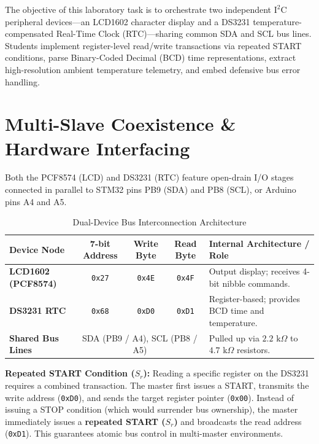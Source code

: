 \documentclass[11pt,a4paper]{article}
\begin{document}

\begin{objectivebox}
The objective of this laboratory task is to orchestrate two independent $\text{I}^2\text{C}$ peripheral devices—an LCD1602 character display and a DS3231 temperature-compensated Real-Time Clock (RTC)—sharing common SDA and SCL bus lines. Students implement register-level read/write transactions via repeated START conditions, parse Binary-Coded Decimal (BCD) time representations, extract high-resolution ambient temperature telemetry, and embed defensive bus error handling.
\end{objectivebox}

\section{Multi-Slave Coexistence \& Hardware Interfacing}
Both the PCF8574 (LCD) and DS3231 (RTC) feature open-drain I/O stages connected in parallel to STM32 pins PB9 (SDA) and PB8 (SCL), or Arduino pins A4 and A5.

\begin{table}[h!]
\centering
\small
\caption{Dual-Device Bus Interconnection Architecture}
\vspace{4pt}
\begin{tabularx}{\textwidth}{l c c c X}
\toprule
\textbf{Device Node} & \textbf{7-bit Address} & \textbf{Write Byte} & \textbf{Read Byte} & \textbf{Internal Architecture / Role} \\
\midrule
\textbf{LCD1602 (PCF8574)} & \texttt{0x27} & \texttt{0x4E} & \texttt{0x4F} & Output display; receives 4-bit nibble commands. \\
\textbf{DS3231 RTC} & \texttt{0x68} & \texttt{0xD0} & \texttt{0xD1} & Register-based; provides BCD time and temperature. \\
\textbf{Shared Bus Lines} & \multicolumn{3}{c}{SDA (PB9 / A4), SCL (PB8 / A5)} & Pulled up via $2.2\text{ k}\Omega$ to $4.7\text{ k}\Omega$ resistors. \\
\bottomrule
\end{tabularx}
\end{table}

\begin{theorybox}
\textbf{Repeated START Condition ($S_r$):} Reading a specific register on the DS3231 requires a combined transaction. The master first issues a START, transmits the write address (\texttt{0xD0}), and sends the target register pointer (\texttt{0x00}). Instead of issuing a STOP condition (which would surrender bus ownership), the master immediately issues a \textbf{repeated START ($S_r$)} and broadcasts the read address (\texttt{0xD1}). This guarantees atomic bus control in multi-master environments.
\end{theorybox}
\end{document}
